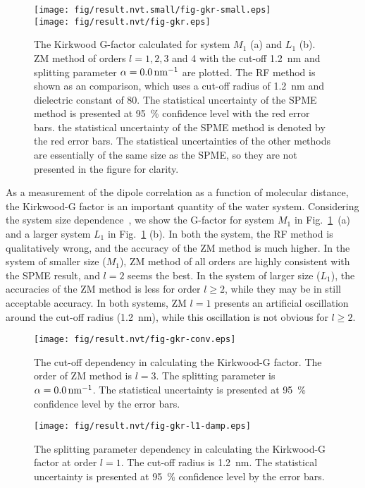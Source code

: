 \documentclass[a4paper,preprint,unsortedaddress,onecolumn,fleqn]{revtex4}
\begin{document}
\begin{figure}[tbp]
\centering
\texttt{[image: fig/result.nvt.small/fig-gkr-small.eps]}\\
\texttt{[image: fig/result.nvt/fig-gkr.eps]} 
\caption{The Kirkwood G-factor calculated for system $%
M_{1}$ (a) and $L_{1} $ (b). ZM method of orders $l=1,2,3$ and 4 with the
cut-off 1.2~nm and splitting parameter $\protect\alpha =0.0\,\text{nm}^{-1}$
are plotted. The RF method is shown as an comparison, which uses a cut-off
radius of 1.2~nm and dielectric constant of 80. The statistical uncertainty
of the SPME method is presented at 95~\% confidence level with the red error
bars. the statistical uncertainty of the SPME method is denoted by the red
error bars. The statistical uncertainties of the other methods are
essentially of the same size as the SPME, so they are not presented in the
figure for clarity.}
\label{fig:gkr}
\end{figure}

As a measurement of the dipole correlation as a function of molecular
distance, the Kirkwood-G factor is an important quantity of the water
system. Considering the system size dependence~\cite{vanderSpoel2006origin},
we show the G-factor for system $M_{1}$ in Fig.~\ref{fig:gkr}~(a) and a
larger system $L_{1}$ in Fig.~\ref{fig:gkr} (b). In both the system, the RF
method is qualitatively wrong, and the accuracy of the ZM method is much
higher. In the system of smaller size ($M_{1}$), ZM method of all orders are
highly consistent with the SPME result, and $l=2$ seems the best. In the
system of larger size ($L_{1}$), the accuracies of the ZM method is less for
order $l\geq 2$, while they may be in still acceptable accuracy. In both
systems, ZM $l=1$ presents an artificial oscillation around the cut-off
radius (1.2~nm), while this oscillation is not obvious for $l\geq 2$.

\begin{figure}[tbp]
\centering
\texttt{[image: fig/result.nvt/fig-gkr-conv.eps]} %
\caption{ The cut-off dependency in calculating the Kirkwood-G factor. The
order of ZM method is $l=3$. The splitting parameter is $\protect%
\alpha =0.0\,\text{nm}^{-1}$. The
statistical uncertainty is presented at 95~\% confidence level by the
error bars. }
\label{fig:gkr-conv}
\end{figure}

\begin{figure}[tbp]
\centering
\texttt{[image: fig/result.nvt/fig-gkr-l1-damp.eps]} %
\caption{ The splitting parameter dependency in calculating the Kirkwood-G factor at order $l=1$.
  The cut-off radius is 1.2~nm. The
statistical uncertainty is presented at 95~\% confidence level by the
error bars. }
\label{fig:gkr-damp-l1}
\end{figure}
\end{document}
